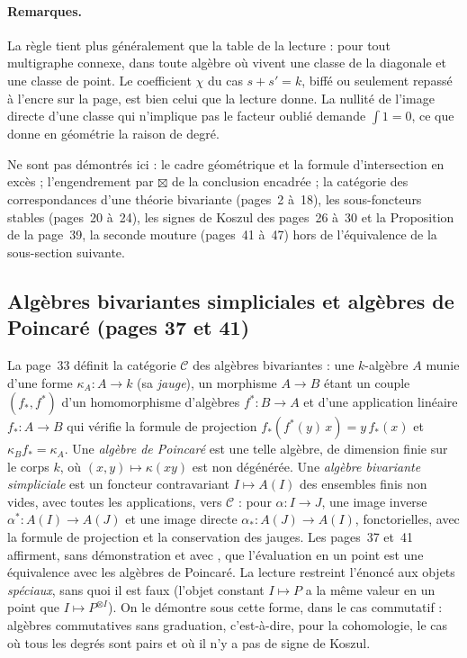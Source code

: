 \paragraph{Remarques.} La règle tient plus généralement que la table de la lecture : pour tout multigraphe connexe, dans toute algèbre où vivent une classe de la diagonale et une classe de point. Le coefficient $\chi$ du cas $s + s' = k$, biffé ou seulement repassé à l'encre sur la page, est bien celui que la lecture donne. La nullité de l'image directe d'une classe qui n'implique pas le facteur oublié demande $\int 1 = 0$, ce que donne en géométrie la raison de degré.

Ne sont pas démontrés ici : le cadre géométrique et la formule d'intersection en excès ; l'engendrement par $\boxtimes$ de la conclusion encadrée ; la catégorie des correspondances d'une théorie bivariante (pages~2 à~18), les sous-foncteurs stables (pages~20 à~24), les signes de Koszul des pages~26 à~30 et la Proposition de la page~39, la seconde mouture (pages~41 à~47) hors de l'équivalence de la sous-section suivante.

\subsection*{Algèbres bivariantes simpliciales et algèbres de Poincaré (pages 37 et 41)}

La page~33 définit la catégorie $\mathcal{C}$ des algèbres bivariantes : une $k$-algèbre $A$ munie d'une forme $\kappa_A : A \to k$ (sa \emph{jauge}), un morphisme $A \to B$ étant un couple $(f_*, f^*)$ d'un homomorphisme d'algèbres $f^* : B \to A$ et d'une application linéaire $f_* : A \to B$ qui vérifie la formule de projection $f_*(f^*(y)\,x) = y\,f_*(x)$ et $\kappa_B f_* = \kappa_A$. Une \emph{algèbre de Poincaré} est une telle algèbre, de dimension finie sur le corps $k$, où $(x, y) \mapsto \kappa(xy)$ est non dégénérée. Une \emph{algèbre bivariante simpliciale} est un foncteur contravariant $I \mapsto A(I)$ des ensembles finis non vides, avec toutes les applications, vers $\mathcal{C}$ : pour $\alpha : I \to J$, une image inverse $\alpha^* : A(I) \to A(J)$ et une image directe $\alpha_* : A(J) \to A(I)$, fonctorielles, avec la formule de projection et la conservation des jauges. Les pages~37 et~41 affirment, sans démonstration et avec , que l'évaluation en un point est une équivalence avec les algèbres de Poincaré. La lecture restreint l'énoncé aux objets \emph{spéciaux}, sans quoi il est faux (l'objet constant $I \mapsto P$ a la même valeur en un point que $I \mapsto P^{\otimes I}$). On le démontre sous cette forme, dans le cas commutatif : algèbres commutatives sans graduation, c'est-à-dire, pour la cohomologie, le cas où tous les degrés sont pairs et où il n'y a pas de signe de Koszul.

